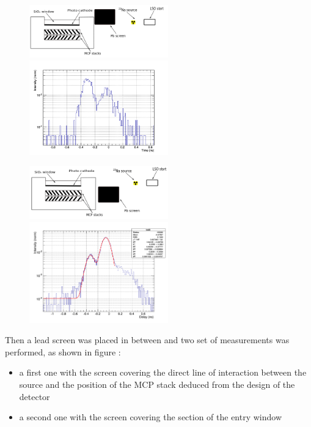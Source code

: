 \begin{figure}[htbp]
\begin{center}
\includegraphics[width=6cm]{../Pictures/Chapter_8/screen_irf_2.png}
\includegraphics[width=6cm]{../Pictures/Chapter_8/turn_1.png}
\end{center}
\caption[]{}
\label{fig:twist2}
\end{figure}
\begin{figure}[htbp]
\begin{center}
\includegraphics[width=6cm]{../Pictures/Chapter_8/screen_irf.png}
\includegraphics[width=6cm]{../Pictures/Chapter_8/turn_2.png}
\end{center}
\caption[]{}
\label{fig:twist1}
\end{figure}
Then a lead screen was placed in between and two set of measurements was performed, as shown in figure :
\begin{itemize}
\item a first one with the screen covering the direct line of interaction between the source and the position of the MCP stack deduced from the design of the detector
\item a second one with the screen covering the section of the entry window
\end{itemize}
